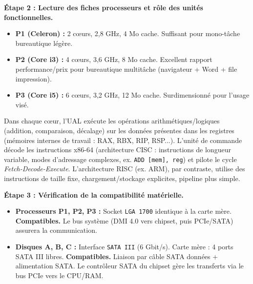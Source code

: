 \documentclass[11pt]{article}
\newcommand{\cle}[1]{{\popxbold\color{popdark}#1}}
\begin{document}
\begin{exoresolu}
\textbf{Étape 2 : Lecture des fiches processeurs et rôle des unités fonctionnelles.}
\begin{itemize}
\item \textbf{P1 (Celeron) :} 2 cœurs, 2,8 GHz, 4 Mo cache. Suffisant pour mono-tâche bureautique légère.
\item \textbf{P2 (Core i3) :} 4 cœurs, 3,6 GHz, 8 Mo cache. Excellent rapport performance/prix pour bureautique multitâche (navigateur + Word + file impression).
\item \textbf{P3 (Core i5) :} 6 cœurs, 3,2 GHz, 12 Mo cache. Surdimensionné pour l'usage visé.
\end{itemize}
Dans chaque cœur, l'\cle{UAL} exécute les opérations arithmétiques/logiques (addition, comparaison, décalage) sur les données présentes dans les \cle{registres} (mémoires internes de travail : RAX, RBX, RIP, RSP...). L'unité de commande décode les instructions x86-64 (architecture \cle{CISC} : instructions de longueur variable, modes d'adressage complexes, ex. \texttt{ADD [mem], reg}) et pilote le cycle \textit{Fetch-Decode-Execute}. L'architecture \cle{RISC} (ex. ARM), par contraste, utilise des instructions de taille fixe, chargement/stockage explicites, pipeline plus simple.

\textbf{Étape 3 : Vérification de la compatibilité matérielle.}
\begin{itemize}
\item \textbf{Processeurs P1, P2, P3 :} Socket \texttt{LGA 1700} identique à la carte mère. \textbf{Compatibles.} Le bus système (DMI 4.0 vers chipset, puis PCIe/SATA) assurera la communication.
\item \textbf{Disques A, B, C :} Interface \texttt{SATA III} (6 Gbit/s). Carte mère : 4 ports SATA III libres. \textbf{Compatibles.} Liaison par câble SATA données + alimentation SATA. Le contrôleur SATA du chipset gère les transferts via le bus PCIe vers le CPU/RAM.
\end{itemize}


\end{exoresolu}
\end{document}
